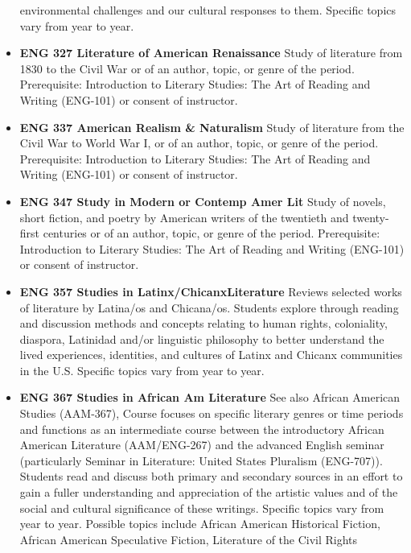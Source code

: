 \documentclass[
  letterpaper,
]{scrbook}
\begin{document}
\begin{itemize}
  environmental challenges and our cultural responses to them. Specific
  topics vary from year to year.\\
\item
  \textbf{ENG 327 Literature of American Renaissance} Study of
  literature from 1830 to the Civil War or of an author, topic, or genre
  of the period. Prerequisite: Introduction to Literary Studies: The Art
  of Reading and Writing (ENG-101) or consent of instructor.\\
\item
  \textbf{ENG 337 American Realism \& Naturalism} Study of literature
  from the Civil War to World War I, or of an author, topic, or genre of
  the period. Prerequisite: Introduction to Literary Studies: The Art of
  Reading and Writing (ENG-101) or consent of instructor.\\
\item
  \textbf{ENG 347 Study in Modern or Contemp Amer Lit} Study of novels,
  short fiction, and poetry by American writers of the twentieth and
  twenty-first centuries or of an author, topic, or genre of the period.
  Prerequisite: Introduction to Literary Studies: The Art of Reading and
  Writing (ENG-101) or consent of instructor.\\
\item
  \textbf{ENG 357 Studies in Latinx/ChicanxLiterature} Reviews selected
  works of literature by Latina/os and Chicana/os. Students explore
  through reading and discussion methods and concepts relating to human
  rights, coloniality, diaspora, Latinidad and/or linguistic philosophy
  to better understand the lived experiences, identities, and cultures
  of Latinx and Chicanx communities in the U.S. Specific topics vary
  from year to year.\\
\item
  \textbf{ENG 367 Studies in African Am Literature} See also African
  American Studies (AAM-367), Course focuses on specific literary genres
  or time periods and functions as an intermediate course between the
  introductory African American Literature (AAM/ENG-267) and the
  advanced English seminar (particularly Seminar in Literature: United
  States Pluralism (ENG-707)). Students read and discuss both primary
  and secondary sources in an effort to gain a fuller understanding and
  appreciation of the artistic values and of the social and cultural
  significance of these writings. Specific topics vary from year to
  year. Possible topics include African American Historical Fiction,
  African American Speculative Fiction, Literature of the Civil Rights

\end{itemize}
\end{document}
